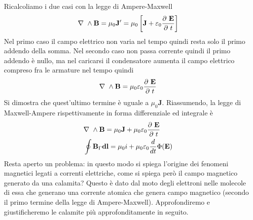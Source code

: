 \documentclass[
10pt, %
a4paper, %
oneside, %
headinclude,footinclude, %
BCOR5mm, %
]{scrartcl}
\begin{document}
Ricalcoliamo i due casi con la legge di Ampere-Maxwell
\[\mathbf{\nabla\ }\wedge\mathbf{B}=\mu_0\mathbf{J'}=\mu_0\left[\mathbf{J}+\varepsilon_0\frac{\partial\  \mathbf{E}}{\partial\  t}\right]\]
Nel primo caso il campo elettrico non varia nel tempo quindi resta solo il primo addendo della somma. Nel secondo caso non passa corrente quindi il primo addendo è nullo, ma nel caricarsi il condensatore aumenta il campo elettrico compreso fra le armature nel tempo quindi 
\[\mathbf{\nabla\ }\wedge\mathbf{B}=\mu_0\varepsilon_0\frac{\partial\  \mathbf{E}}{\partial\  t}\]
Si dimostra che quest'ultimo termine è uguale a \(\mu_0\mathbf{J}\).
Riassumendo, la legge di Maxwell-Ampere rispettivamente in forma differenziale ed integrale è
\begin{align}\label{eq:legge_Maxwell_Ampere}
	&\mathbf{\nabla\ }\wedge\mathbf{B}=\mu_0\mathbf{J}+\mu_0\varepsilon_0\frac{\partial\ \mathbf{E}}{\partial\  t}\\
	&\oint\mathbf{B}_{\Gamma}\mathbf{dl}= \mu_0 i + \mu_0\varepsilon_0\frac{d}{dt}\Phi(\mathbf{E})
\end{align}
Resta aperto un problema: in questo modo si spiega l'origine dei fenomeni magnetici legati a correnti elettriche, come si spiega però il campo magnetico generato da una calamita? Questo è dato dal moto degli elettroni nelle molecole di essa che generano una corrente atomica che genera campo magnetico (secondo il primo termine della legge di Ampere-Maxwell). Approfondiremo e giustificheremo le calamite più approfonditamente in seguito.
\end{document}
